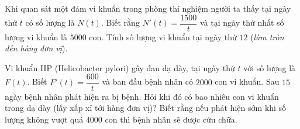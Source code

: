 \begin{ex}%
	Khi quan sát một đám vi khuẩn trong phòng thí nghiệm người ta thấy tại ngày thứ $t$ có số lượng là $N(t)$. Biết rằng $N'(t)=\dfrac{1500}{t}$ và tại ngày thứ nhất số lượng vi khuẩn là $5000$ con. Tính số lượng vi khuẩn tại ngày thứ $12$ (\textit{làm tròn đến hàng đơn vị}).
\end{ex}

\begin{ex}%
	Vi khuẩn HP (Helicobacter pylori) gây đau dạ dày, tại ngày thứ $t$ với số lượng là $F(t)$. Biết $F'(t)=\dfrac{600}{t}$ và ban đầu bệnh nhân có $2000$ con vi khuẩn. Sau $15$ ngày bệnh nhân phát hiện ra bị bệnh. Hỏi khi đó có bao nhiêu con vi khuẩn trong dạ dày (lấy xấp xỉ tới hàng đơn vị)? Biết rằng nếu phát hiện sớm khi số lượng không vượt quá $4000$ con thì bệnh nhân sẽ được cứu chữa.
\end{ex}
